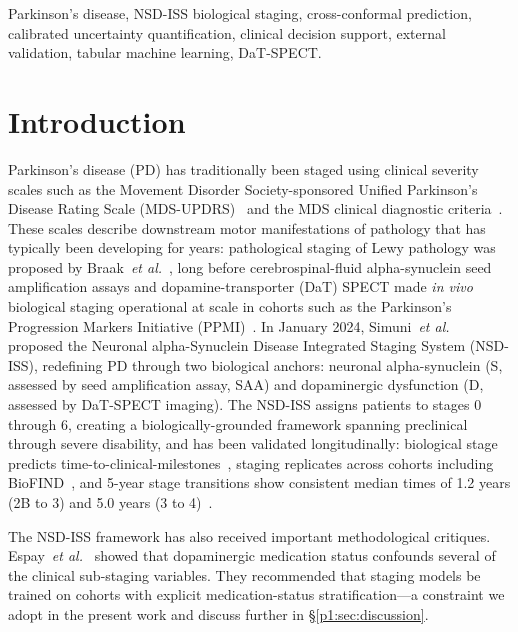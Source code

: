 \begin{IEEEkeywords}
Parkinson's disease, NSD-ISS biological staging, cross-conformal prediction, calibrated uncertainty quantification, clinical decision support, external validation, tabular machine learning, DaT-SPECT.
\end{IEEEkeywords}

\section{Introduction}
\label{p1:sec:introduction}

Parkinson's disease (PD) has traditionally been staged using clinical severity scales such as the Movement Disorder Society-sponsored Unified Parkinson's Disease Rating Scale (MDS-UPDRS)~\cite{goetz2008} and the MDS clinical diagnostic criteria~\cite{postuma2015}. These scales describe downstream motor manifestations of pathology that has typically been developing for years: pathological staging of Lewy pathology was proposed by Braak~\textit{et al.}~\cite{braak2003}, long before cerebrospinal-fluid alpha-synuclein seed amplification assays and dopamine-transporter (DaT) SPECT made \emph{in vivo} biological staging operational at scale in cohorts such as the Parkinson's Progression Markers Initiative (PPMI)~\cite{marek2018ppmi}. In January 2024, Simuni~\textit{et al.}~\cite{simuni2024} proposed the Neuronal alpha-Synuclein Disease Integrated Staging System (NSD-ISS), redefining PD through two biological anchors: neuronal alpha-synuclein (S, assessed by seed amplification assay, SAA) and dopaminergic dysfunction (D, assessed by DaT-SPECT imaging). The NSD-ISS assigns patients to stages 0 through 6, creating a biologically-grounded framework spanning preclinical through severe disability, and has been validated longitudinally: biological stage predicts time-to-clinical-milestones~\cite{simuni2024val}, staging replicates across cohorts including BioFIND~\cite{russo2025}, and 5-year stage transitions show consistent median times of 1.2 years (2B to 3) and 5.0 years (3 to 4)~\cite{simuni2025}.

The NSD-ISS framework has also received important methodological critiques. Espay~\textit{et al.}~\cite{espay2025med} showed that dopaminergic medication status confounds several of the clinical sub-staging variables. They recommended that staging models be trained on cohorts with explicit medication-status stratification---a constraint we adopt in the present work and discuss further in \S\ref{p1:sec:discussion}.

